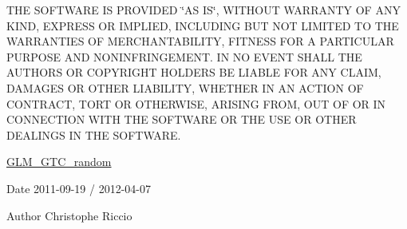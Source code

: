 T\-H\-E S\-O\-F\-T\-W\-A\-R\-E I\-S P\-R\-O\-V\-I\-D\-E\-D \char`\"{}\-A\-S I\-S\char`\"{}, W\-I\-T\-H\-O\-U\-T W\-A\-R\-R\-A\-N\-T\-Y O\-F A\-N\-Y K\-I\-N\-D, E\-X\-P\-R\-E\-S\-S O\-R I\-M\-P\-L\-I\-E\-D, I\-N\-C\-L\-U\-D\-I\-N\-G B\-U\-T N\-O\-T L\-I\-M\-I\-T\-E\-D T\-O T\-H\-E W\-A\-R\-R\-A\-N\-T\-I\-E\-S O\-F M\-E\-R\-C\-H\-A\-N\-T\-A\-B\-I\-L\-I\-T\-Y, F\-I\-T\-N\-E\-S\-S F\-O\-R A P\-A\-R\-T\-I\-C\-U\-L\-A\-R P\-U\-R\-P\-O\-S\-E A\-N\-D N\-O\-N\-I\-N\-F\-R\-I\-N\-G\-E\-M\-E\-N\-T. I\-N N\-O E\-V\-E\-N\-T S\-H\-A\-L\-L T\-H\-E A\-U\-T\-H\-O\-R\-S O\-R C\-O\-P\-Y\-R\-I\-G\-H\-T H\-O\-L\-D\-E\-R\-S B\-E L\-I\-A\-B\-L\-E F\-O\-R A\-N\-Y C\-L\-A\-I\-M, D\-A\-M\-A\-G\-E\-S O\-R O\-T\-H\-E\-R L\-I\-A\-B\-I\-L\-I\-T\-Y, W\-H\-E\-T\-H\-E\-R I\-N A\-N A\-C\-T\-I\-O\-N O\-F C\-O\-N\-T\-R\-A\-C\-T, T\-O\-R\-T O\-R O\-T\-H\-E\-R\-W\-I\-S\-E, A\-R\-I\-S\-I\-N\-G F\-R\-O\-M, O\-U\-T O\-F O\-R I\-N C\-O\-N\-N\-E\-C\-T\-I\-O\-N W\-I\-T\-H T\-H\-E S\-O\-F\-T\-W\-A\-R\-E O\-R T\-H\-E U\-S\-E O\-R O\-T\-H\-E\-R D\-E\-A\-L\-I\-N\-G\-S I\-N T\-H\-E S\-O\-F\-T\-W\-A\-R\-E.

\hyperlink{group__gtc__random}{G\-L\-M\-\_\-\-G\-T\-C\-\_\-random}

\begin{DoxyDate}{Date}
2011-\/09-\/19 / 2012-\/04-\/07 
\end{DoxyDate}
\begin{DoxyAuthor}{Author}
Christophe Riccio 
\end{DoxyAuthor}
